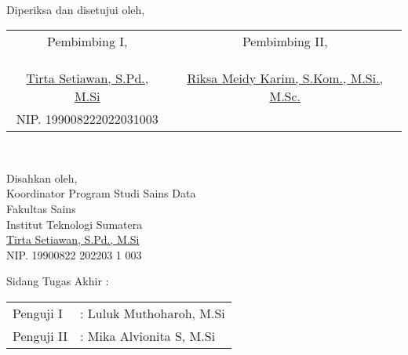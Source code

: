 \begin{center}
\begin{singlespace}
		\begin{onehalfspace}
			\\[0.5cm]
		\end{onehalfspace}
	\end{singlespace}	
		\vspace{-0.5cm} %
	\centering Diperiksa dan disetujui oleh,
	\vspace{1em} %
	\justify
	\setlength{\tabcolsep}{0pt}
	\begin{tabular}{p{}p{}}
		\multicolumn{1}{c}{Pembimbing I,} & \multicolumn{1}{c}{Pembimbing II,}\\
		&\\
		&\\
		&\\
		\multicolumn{1}{c}{\underline{Tirta Setiawan, S.Pd., M.Si}} & \multicolumn{1}{c}{\underline{Riksa Meidy Karim, S.Kom., M.Si., M.Sc.}} \\
		\multicolumn{1}{c}{NIP. 199008222022031003} & \multicolumn{1}{c}{} \\
	\end{tabular}
	\\
	\centering 
	\begin{singlespace}
		Disahkan oleh,\\
			\vspace{1em} %
		Koordinator Program Studi Sains Data\\
		Fakultas Sains\\
		Institut Teknologi Sumatera\\[1.5cm]
		\underline{Tirta Setiawan, S.Pd., M.Si} \\ %
		NIP. 19900822 202203 1 003
	\end{singlespace}
\end{center}

	\vspace{0.5cm} %
\begin{flushright}
	Sidang Tugas Akhir :     
\end{flushright}
	\vspace{-1.0cm} %

	\flushleft
\setlength{\tabcolsep}{0pt}
\begin{tabular}{l l}
	Penguji  I 			&  : Luluk Muthoharoh, M.Si \\
	Penguji  II 		&  : Mika Alvionita S, M.Si
\end{tabular}